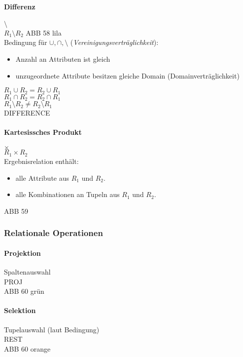 \paragraph{Differenz} $\setminus$\\
$R_1\setminus R_2$
ABB 58 lila\\
Bedingung für $\cup, \cap, \setminus$ (\emph{Vereinigungsverträglichkeit}):
\begin{itemize}
\item Anzahl an Attributen ist gleich
\item unzugeordnete Attribute besitzen gleiche Domain (Domainverträglichkeit)
\end{itemize}
$R_1\cup R_2 = R_2 \cup R_1$\\
$R_1 \cap R_2 = R_2 \cap R_1$\\
$R_1 \setminus R_2 \not = R_2 \setminus R_1$\\
DIFFERENCE
\paragraph{Kartesissches Produkt} $\times$\\
$R_1\times R_2$\\
Ergebnisrelation enthält: 
\begin{itemize}
\item alle Attribute aus $R_1$ und $R_2$.
\item alle Kombinationen an Tupeln aus $R_1$ und $R_2$.
\end{itemize}
ABB 59
\subsubsection{Relationale Operationen}
\paragraph{Projektion} Spaltenauswahl\\
PROJ\\
ABB 60 grün
\paragraph{Selektion} Tupelauswahl (laut Bedingung)\\
REST\\
ABB 60 orange
